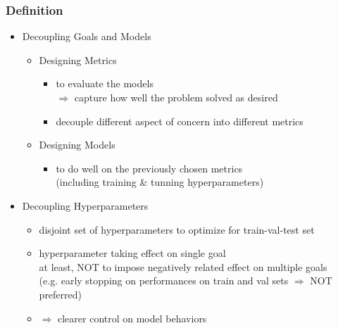 \subsubsection{Definition}
\begin{itemize}
\item Decoupling Goals and Models
	\begin{itemize}
	\item Designing Metrics
		\begin{itemize}
		\item to evaluate the models \\ 
		$\Rightarrow$ capture how well the problem solved as desired
		\item decouple different aspect of concern into different metrics
		\end{itemize}
	\item Designing Models
		\begin{itemize}
		\item to do well on the previously chosen metrics \\
		(including training \& tunning hyperparameters)
		\end{itemize}
	\end{itemize}
\item Decoupling Hyperparameters
	\begin{itemize}
	\item disjoint set of hyperparameters to optimize for train-val-test set
	\item hyperparameter taking effect on single goal \\
	at least, NOT to impose negatively related effect on multiple goals \\
	(e.g. early stopping on performances on train and val sets $\Rightarrow$ NOT preferred)
	\item $\Rightarrow$ clearer control on model behaviors
	\end{itemize}
\end{itemize}

